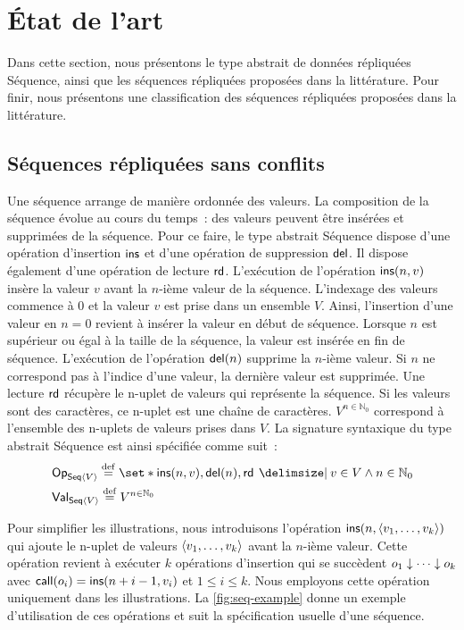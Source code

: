 \section{État de l'art}\label{sec:state-art-seq}

Dans cette section, nous présentons le type abstrait de données répliquées Séquence, ainsi que les séquences répliquées proposées dans la littérature.
Pour finir, nous présentons une classification des séquences répliquées proposées dans la littérature.

\subsection{Séquences répliquées sans conflits}\label{subsec:replseq}

Une séquence arrange de manière ordonnée des valeurs.
La composition de la séquence évolue au cours du temps~: des valeurs peuvent être insérées et supprimées de la séquence.
Pour ce faire, le type abstrait Séquence dispose d'une opération d'insertion $\trm{ins}$ et d'une opération de suppression $\trm{del}$.
Il dispose également d'une opération de lecture $\trm{rd}$.
L'exécution de l'opération $\trm{ins}(n, v)$ insère la valeur $v$ avant la $n$-ième valeur de la séquence.
L'indexage des valeurs commence à $0$ et la valeur $v$ est prise dans un ensemble $V$.
Ainsi, l'insertion d'une valeur en $n = 0$ revient à insérer la valeur en début de séquence.
Lorsque $n$ est supérieur ou égal à la taille de la séquence, la valeur est insérée en fin de séquence.
L'exécution de l'opération $\trm{del}(n)$ supprime la $n$-ième valeur.
Si $n$ ne correspond pas à l'indice d'une valeur, la dernière valeur est supprimée.
Une lecture $\trm{rd}$ récupère le n-uplet de valeurs qui représente la séquence.
Si les valeurs sont des caractères, ce n-uplet est une chaîne de caractères.
$V^{n \in \mathbb{N}_0}$ correspond à l'ensemble des n-uplets de valeurs prises dans $V$.
La signature syntaxique du type abstrait Séquence est ainsi spécifiée comme suit~:
%
\begin{align*}
&\trm{Op}_{\trm{Seq}\tuple*{V}} \defeq \set*{\trm{ins}(n, v), \trm{del}(n), \trm{rd} \given v \in V \land n \in \mathbb{N}_0}\\
&\trm{Val}_{\trm{Seq}\tuple*{V}} \defeq V^{n \in \mathbb{N}_0}
\end{align*}

Pour simplifier les illustrations, nous introduisons l'opération $\trm{ins}(n, \tuple*{v_1,\dotsc,v_k})$ qui ajoute le n-uplet de valeurs $\tuple*{v_1,\dotsc,v_k}$ avant la $n$-ième valeur.
Cette opération revient à exécuter $k$ opérations d'insertion qui se succèdent $o_1 \idr \dotsb \idr o_k$ avec $\trm{call}(o_i) = \trm{ins}(n+i-1, v_i)$ et $1 \leq i \leq k$.
Nous employons cette opération uniquement dans les illustrations.
La \autoref{fig:seq-example} donne un exemple d'utilisation de ces opérations et suit la spécification usuelle d'une séquence.

